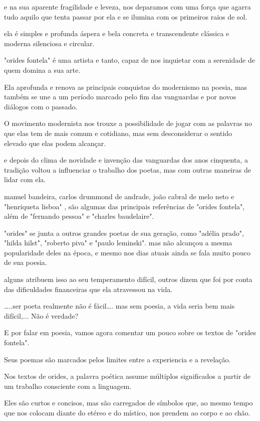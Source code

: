 \documentclass[12pt]{extarticle}
\begin{document}
e na sua aparente fragilidade e leveza, nos deparamos com uma força que agarra tudo aquilo que tenta passar por ela e se ilumina com os primeiros raios de sol.

ela é simples e profunda
áspera e bela 
concreta e transcendente
clássica e moderna
silenciosa e circular.

"orides fontela" é uma artista e tanto, capaz de nos inquietar com a serenidade de quem domina a sua arte.


Ela aprofunda e renova as principais conquistas do modernismo na poesia, mas também se une a um período marcado pelo fim das vanguardas e por novos diálogos com o passado.


O movimento modernista nos trouxe a possibilidade de jogar com as palavras no que elas tem de mais comum e cotidiano, mas sem desconsiderar o sentido elevado que elas podem alcançar.

e depois do clima de novidade e invenção das vanguardas dos anos cinquenta, a tradição voltou a influenciar o trabalho dos poetas, mas com outras maneiras de lidar com ela.

manuel bandeira, carlos drummond de andrade, joão cabral de melo neto  e "henriqueta lisboa" ,    são algumas das principais referências de "orides fontela", além de "fernando pessoa" e "charles baudelaire".


"orides" se junta a outros grandes poetas de sua geração, como "adélia prado", "hilda hilst", "roberto piva" e "paulo leminski".
mas não alcançou a mesma popularidade deles na época, e mesmo nos dias atuais ainda se fala muito  pouco de sua poesia.

alguns atribuem isso ao seu temperamento difícil, outros dizem que foi por conta  das dificuldades financeiras que ela atravessou na vida.


…..ser poeta realmente não é fácil….
mas sem poesia, a vida seria bem mais difícil,... Não é verdade?

E por falar em poesia, vamos agora comentar um pouco sobre os textos de "orides fontela".

Seus poemas são marcados pelos limites entre a experiencia e a revelação.


Nos textos de orides, a palavra poética assume múltiplos significados a partir de um trabalho consciente com a linguagem.


Eles são curtos e concisos, mas são carregados de símbolos que, ao mesmo tempo que nos colocam diante do etéreo e do místico, nos prendem ao corpo e ao chão.
\end{document}
